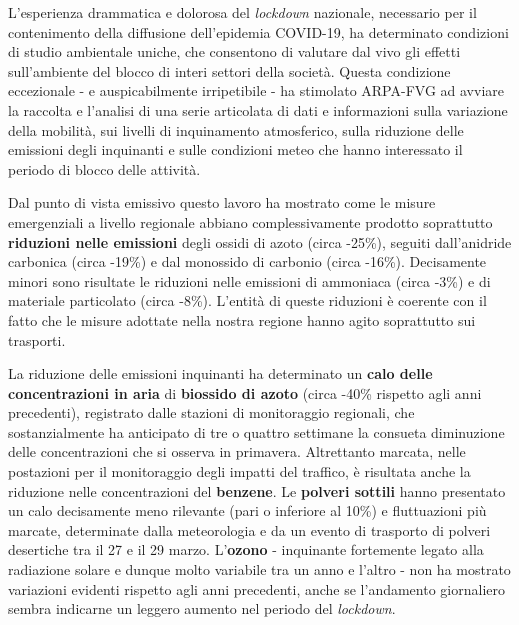 L'esperienza drammatica e dolorosa del \textit{lockdown} nazionale, necessario per il contenimento della diffusione dell'epidemia COVID-19, ha determinato condizioni di studio ambientale uniche, che consentono di valutare dal vivo gli effetti sull'ambiente del blocco di interi settori della società.
Questa condizione eccezionale - e auspicabilmente irripetibile - ha stimolato ARPA-FVG ad avviare la raccolta e l'analisi di una serie articolata di dati e informazioni sulla variazione della mobilità, sui livelli di inquinamento atmosferico, sulla riduzione delle emissioni degli inquinanti e sulle condizioni meteo che hanno interessato il periodo di blocco delle attività. 

Dal punto di vista emissivo questo lavoro ha mostrato come le misure emergenziali a livello regionale abbiano complessivamente prodotto soprattutto \textbf{riduzioni nelle emissioni} degli ossidi di azoto (circa -25\%), seguiti dall’anidride carbonica (circa -19\%) e dal monossido di carbonio (circa -16\%). Decisamente minori sono risultate le riduzioni nelle emissioni di ammoniaca (circa -3\%) e di materiale particolato (circa -8\%). L’entità di queste riduzioni è coerente con il fatto che le misure adottate nella nostra regione hanno agito soprattutto sui trasporti. 

La riduzione delle emissioni inquinanti ha determinato un \textbf{calo delle concentrazioni in aria} di \textbf{biossido di azoto} (circa -40\% rispetto agli anni precedenti), registrato dalle stazioni di monitoraggio regionali, che sostanzialmente ha anticipato di tre o quattro settimane la consueta diminuzione delle concentrazioni che si osserva in primavera. Altrettanto marcata, nelle postazioni per il monitoraggio degli impatti del traffico, è risultata anche la riduzione nelle concentrazioni del \textbf{benzene}.
Le \textbf{polveri sottili} hanno presentato un calo decisamente meno rilevante (pari o inferiore al 10\%) e fluttuazioni più marcate, determinate dalla meteorologia e da un evento di trasporto di polveri desertiche tra il 27 e il 29 marzo. 
L'\textbf{ozono} - inquinante fortemente legato alla radiazione solare e dunque molto variabile tra un anno e l'altro - non ha mostrato variazioni evidenti rispetto agli anni precedenti, anche se l’andamento giornaliero sembra indicarne un leggero aumento nel periodo del \textit{lockdown}. 

